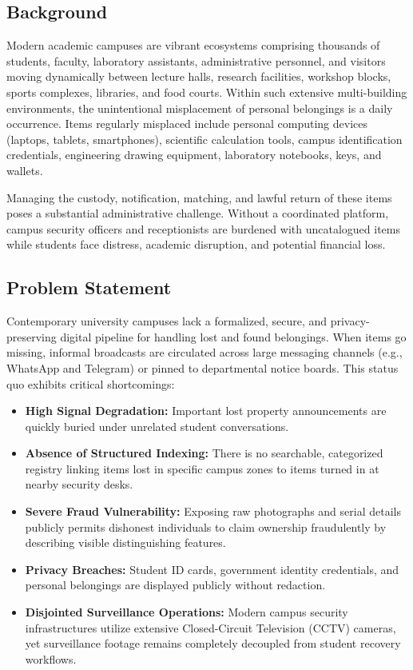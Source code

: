 \documentclass[11pt,a4paper]{article}
\begin{document}
\subsection{Background}
Modern academic campuses are vibrant ecosystems comprising thousands of students, faculty, laboratory assistants, administrative personnel, and visitors moving dynamically between lecture halls, research facilities, workshop blocks, sports complexes, libraries, and food courts. Within such extensive multi-building environments, the unintentional misplacement of personal belongings is a daily occurrence. Items regularly misplaced include personal computing devices (laptops, tablets, smartphones), scientific calculation tools, campus identification credentials, engineering drawing equipment, laboratory notebooks, keys, and wallets. 

Managing the custody, notification, matching, and lawful return of these items poses a substantial administrative challenge. Without a coordinated platform, campus security officers and receptionists are burdened with uncatalogued items while students face distress, academic disruption, and potential financial loss.

\subsection{Problem Statement}
Contemporary university campuses lack a formalized, secure, and privacy-preserving digital pipeline for handling lost and found belongings. When items go missing, informal broadcasts are circulated across large messaging channels (e.g., WhatsApp and Telegram) or pinned to departmental notice boards. This status quo exhibits critical shortcomings:
\begin{itemize}
    \item \textbf{High Signal Degradation:} Important lost property announcements are quickly buried under unrelated student conversations.
    \item \textbf{Absence of Structured Indexing:} There is no searchable, categorized registry linking items lost in specific campus zones to items turned in at nearby security desks.
    \item \textbf{Severe Fraud Vulnerability:} Exposing raw photographs and serial details publicly permits dishonest individuals to claim ownership fraudulently by describing visible distinguishing features.
    \item \textbf{Privacy Breaches:} Student ID cards, government identity credentials, and personal belongings are displayed publicly without redaction.
    \item \textbf{Disjointed Surveillance Operations:} Modern campus security infrastructures utilize extensive Closed-Circuit Television (CCTV) cameras, yet surveillance footage remains completely decoupled from student recovery workflows.
\end{itemize}
\end{document}
